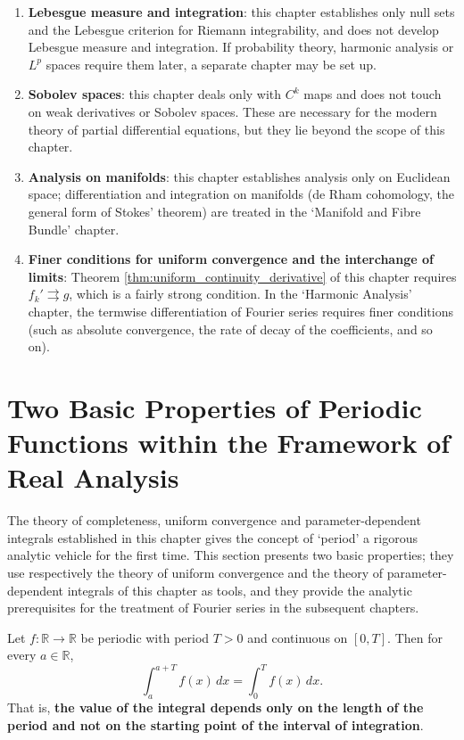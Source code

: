 \begin{remark}\label{rem:ra_open}
\begin{enumerate}[label=(\roman*)]
    \item \textbf{Lebesgue measure and integration}: this chapter establishes only null sets and the Lebesgue criterion for Riemann integrability, and does not develop Lebesgue measure and integration. If probability theory, harmonic analysis or $L^p$ spaces require them later, a separate chapter may be set up.
    \item \textbf{Sobolev spaces}: this chapter deals only with $C^k$ maps and does not touch on weak derivatives or Sobolev spaces. These are necessary for the modern theory of partial differential equations, but they lie beyond the scope of this chapter.
    \item \textbf{Analysis on manifolds}: this chapter establishes analysis only on Euclidean space; differentiation and integration on manifolds (de Rham cohomology, the general form of Stokes' theorem) are treated in the `Manifold and Fibre Bundle' chapter.
    \item \textbf{Finer conditions for uniform convergence and the interchange of limits}: Theorem \ref{thm:uniform_continuity_derivative} of this chapter requires $f_k' \rightrightarrows g$, which is a fairly strong condition. In the `Harmonic Analysis' chapter, the termwise differentiation of Fourier series requires finer conditions (such as absolute convergence, the rate of decay of the coefficients, and so on).
\end{enumerate}
\end{remark}

\section{Two Basic Properties of Periodic Functions within the Framework of Real Analysis}
\label{sec:periodic_functions_in_real_analysis}

The theory of completeness, uniform convergence and parameter-dependent integrals established in this chapter gives the concept of `period' a rigorous analytic vehicle for the first time. This section presents two basic properties; they use respectively the theory of uniform convergence and the theory of parameter-dependent integrals of this chapter as tools, and they provide the analytic prerequisites for the treatment of Fourier series in the subsequent chapters.

\begin{proposition}\label{prop:period_integral_shift_invariant}
Let $f:\mathbb R\to\mathbb R$ be periodic with period $T>0$ and continuous on $[0,T]$. Then for every $a\in\mathbb R$,
\[
\int_a^{a+T}f(x)\,dx=\int_0^{T}f(x)\,dx .
\]
That is, \textbf{the value of the integral depends only on the length of the period and not on the starting point of the interval of integration}.
\end{proposition}

